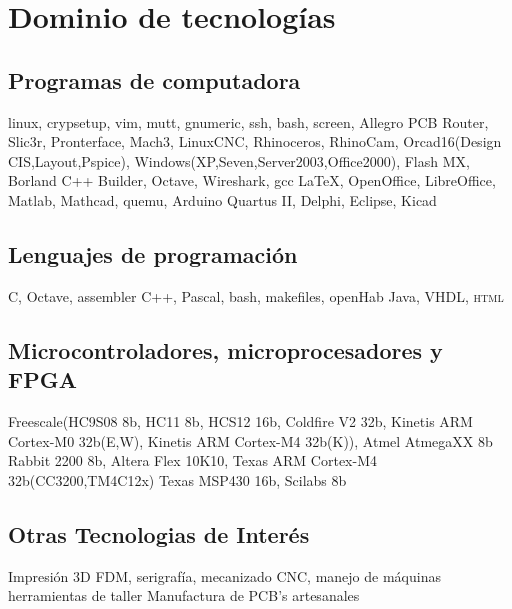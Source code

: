 \documentclass[11pt,a4paper,sans]{moderncv} 	%
\begin{document}
\section{Dominio de tecnologías}
	\subsection{Programas de computadora}
	 	{linux, crypsetup, vim, mutt, gnumeric, ssh, bash, screen, Allegro PCB Router, Slic3r, Pronterface, Mach3, LinuxCNC, Rhinoceros, RhinoCam, Orcad16(Design CIS,Layout,Pspice), Windows(XP,Seven,Server2003,Office2000), Flash MX, Borland C++ Builder, Octave, Wireshark, gcc}
	 	{\LaTeX, OpenOffice, LibreOffice, Matlab, Mathcad, quemu, Arduino}
	 	{Quartus II, Delphi, Eclipse, Kicad}

	\subsection{Lenguajes de programación}
	 	{C, Octave, assembler}
	 	{C++, Pascal, bash, makefiles, openHab}
	 	{Java, VHDL, \textsc{html}}

	\subsection{Microcontroladores, microprocesadores y FPGA}
	 	{Freescale(HC9S08 8b, HC11 8b, HCS12 16b, Coldfire V2 32b, Kinetis ARM Cortex-M0 32b(E,W), Kinetis ARM Cortex-M4 32b(K)), Atmel AtmegaXX 8b}
	 	{Rabbit 2200 8b, Altera Flex 10K10, Texas ARM Cortex-M4 32b(CC3200,TM4C12x)}
	 	{Texas MSP430 16b, Scilabs 8b}
	
	\subsection{Otras Tecnologias de Interés}
	 	{Impresión 3D FDM, serigrafía, mecanizado CNC, manejo de máquinas herramientas de taller}
	 	{Manufactura de PCB's artesanales}
	 	{}

\end{document}
